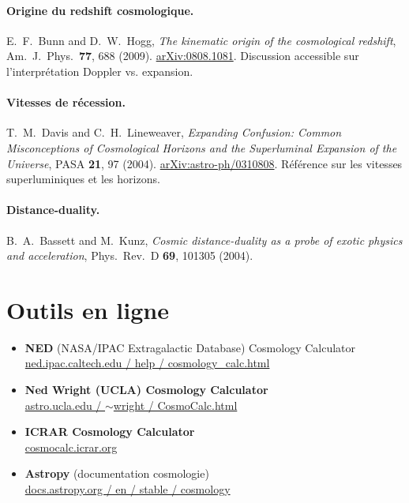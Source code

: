 \documentclass[11pt,a4paper,openany]{report}
\begin{document}
\paragraph{Origine du redshift cosmologique.}
E.~F.~Bunn and D.~W.~Hogg, \emph{The kinematic origin of the cosmological redshift},
Am.\ J.\ Phys.\ \textbf{77}, 688 (2009).
\href{https://arxiv.org/abs/0808.1081}{arXiv:0808.1081}.
Discussion accessible sur l'interprétation Doppler vs. expansion.

\paragraph{Vitesses de récession.}
T.~M.~Davis and C.~H.~Lineweaver, \emph{Expanding Confusion: Common
Misconceptions of Cosmological Horizons and the Superluminal Expansion of the
Universe}, PASA \textbf{21}, 97 (2004).
\href{https://arxiv.org/abs/astro-ph/0310808}{arXiv:astro-ph/0310808}.
Référence sur les vitesses superluminiques et les horizons.

\paragraph{Distance-duality.}
B.~A.~Bassett and M.~Kunz, \emph{Cosmic distance-duality as a probe of exotic
physics and acceleration}, Phys.\ Rev.\ D \textbf{69}, 101305 (2004).

\section{Outils en ligne}

\begin{itemize}[topsep=2pt,leftmargin=*]
\item \textbf{NED} (NASA/IPAC Extragalactic Database) Cosmology Calculator\\
  \href{https://ned.ipac.caltech.edu/help/cosmology_calc.html}{ned.ipac.caltech.edu / help / cosmology\_calc.html}
\item \textbf{Ned Wright (UCLA) Cosmology Calculator}\\
  \href{https://www.astro.ucla.edu/~wright/CosmoCalc.html}{astro.ucla.edu / $\sim$wright / CosmoCalc.html}
\item \textbf{ICRAR Cosmology Calculator}\\
  \href{https://cosmocalc.icrar.org/}{cosmocalc.icrar.org}
\item \textbf{Astropy} (documentation cosmologie)\\
  \href{https://docs.astropy.org/en/stable/cosmology/}{docs.astropy.org / en / stable / cosmology}
\end{itemize}
\end{document}
